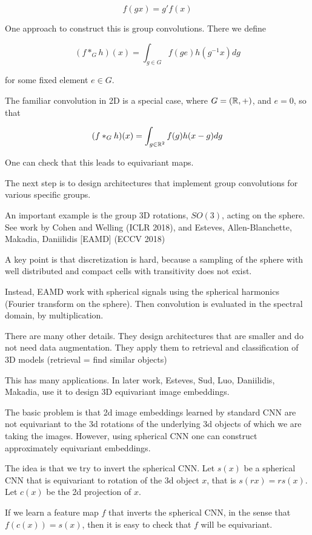 \documentclass[english]{article}
\begin{document}
$$f(gx) = g'f(x)$$

\item One approach to construct this is group convolutions. There we define

$$(f *_G h)(x) = \int_{g\in G} f(ge)h(g^{-1}x)dg$$

for some fixed element $e\in G$. 

The familiar convolution in 2D is a special case, where $G = (\mathbb{R},+)$, and $e = 0$, so that 

$$(f *_G h)(x) = \int_{g\in \mathbb{R}^2} f(g)h(x-g)dg$$

One can check that this leads to equivariant maps.

\item The next step is to design architectures that implement group convolutions for various specific groups. 

An important example is the group 3D rotations, $SO(3)$, acting on the sphere. See work by Cohen and Welling (ICLR 2018), and Esteves, Allen-Blanchette, Makadia, Daniilidis [EAMD] (ECCV 2018)

A key point is that discretization is hard, because a sampling of the sphere with well distributed and compact cells with transitivity does not exist. 

\item Instead, EAMD work with spherical signals using the spherical harmonics (Fourier transform on the sphere). Then convolution is evaluated in the spectral domain, by multiplication. 

There are many other details. They design architectures that are smaller and do not need data augmentation. They apply them to retrieval and classification of 3D models (retrieval = find similar objects)

\item This has many applications. In later work, Esteves, Sud, Luo, Daniilidis, Makadia, use it to design 3D equivariant image embeddings. 

The basic problem is that 2d image embeddings learned by standard CNN are not equivariant to the 3d rotations of the underlying 3d objects of which we are taking the images. However, using spherical CNN one can construct approximately equivariant embeddings. 

The idea is that we try to invert the spherical CNN. Let $s(x)$ be a spherical CNN that is equivariant to rotation of the 3d object $x$, that is $s(rx)=rs(x)$. Let $c(x)$ be the 2d projection of $x$. 

If we learn a feature map $f$ that inverts the spherical CNN, in the sense that $f(c(x))=s(x)$, then it is easy to check that $f$ will be equivariant. 
\end{document}
